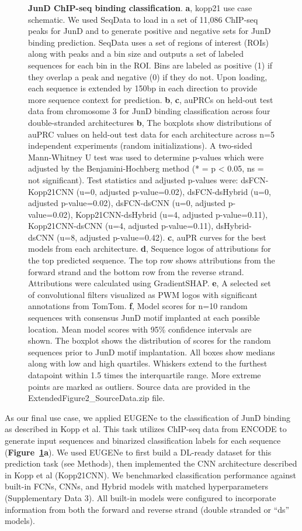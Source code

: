\begin{figure}[p]
    \caption[JunD ChIP-seq binding classification]{\textbf{JunD ChIP-seq binding classification}. \textbf{a}, kopp21 use case schematic. We used SeqData to load in a set of 11,086 ChIP-seq peaks for JunD and to generate positive and negative sets for JunD binding prediction. SeqData uses a set of regions of interest (ROIs) along with peaks and a bin size and outputs a set of labeled sequences for each bin in the ROI. Bins are labeled as positive (1) if they overlap a peak and negative (0) if they do not. Upon loading, each sequence is extended by 150bp in each direction to provide more sequence context for prediction. \textbf{b}, \textbf{c}, auPRCs on held-out test data from chromosome 3 for JunD binding classification across four double-stranded architectures \textbf{b}, The boxplots show distributions of auPRC values on held-out test data for each architecture across n=5 independent experiments (random initializations). A two-sided Mann-Whitney U test was used to determine p-values which were adjusted by the Benjamini-Hochberg method  (* = p < 0.05, ns = not significant). Test statistics and adjusted p-values were: dsFCN-Kopp21CNN (u=0, adjusted p-value=0.02), dsFCN-dsHybrid (u=0, adjusted p-value=0.02), dsFCN-dsCNN (u=0, adjusted p-value=0.02), Kopp21CNN-dsHybrid (u=4, adjusted p-value=0.11), Kopp21CNN-dsCNN (u=4, adjusted p-value=0.11), dsHybrid-dsCNN (u=8, adjusted p-value=0.42). \textbf{c}, auPR curves for the best models from each architecture. \textbf{d}, Sequence logos of attributions for the top predicted sequence. The top row shows attributions from the forward strand and the bottom row from the reverse strand. Attributions were calculated using GradientSHAP. \textbf{e}, A selected set of convolutional filters visualized as PWM logos with significant annotations from TomTom. \textbf{f}, Model scores for n=10 random sequences with consensus JunD motif implanted at each possible location. Mean model scores with 95\% confidence intervals are shown. The boxplot shows the distribution of scores for the random sequences prior to JunD motif implantation. All boxes show medians along with low and high quartiles. Whiskers extend to the furthest datapoint within 1.5 times the interquartile range. More extreme points are marked as outliers. Source data are provided in the ExtendedFigure2\_SourceData.zip file.}
    \label{fig:1 Figure 4}
\end{figure}

As our final use case, we applied EUGENe to the classification of JunD binding as described in Kopp et al\cite{Kopp2020-fw}. This task utilizes ChIP-seq data from ENCODE\cite{ENCODE_Project_Consortium2012-tn} to generate input sequences and binarized classification labels for each sequence (\textbf{Figure~\ref{fig:1 Figure 4}a}). We used EUGENe to first build a DL-ready dataset for this prediction task (see Methods), then implemented the CNN architecture described in Kopp et al (Kopp21CNN). We benchmarked classification performance against built-in FCNs, CNNs, and Hybrid models with matched hyperparameters (Supplementary Data 3). All built-in models were configured to incorporate information from both the forward and reverse strand (double stranded or “ds” models). 


